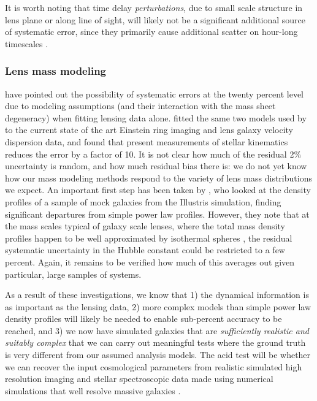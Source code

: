 It is worth noting that time delay {\it perturbations},  due to small
scale structure in lens plane or along line of sight, will likely not be
a significant  additional source of systematic error, since they
primarily cause additional scatter on hour-long timescales
\citep{K+M09}.


\subsubsection{Lens mass modeling}

\citet{S+S13} have pointed out the possibility of systematic errors at
the twenty percent level due to modeling assumptions (and their
interaction with the mass sheet degeneracy) when fitting lensing data
alone.
\citet{Suy++14} fitted the same two models used by
\citet{S+S13}  to the current state of the art Einstein ring imaging and
lens galaxy velocity dispersion data, and found that present
measurements of stellar kinematics reduces the error by a factor of
10.  It is not clear how much of the residual 2\% uncertainty is
random, and how much residual bias there is: we do not
yet know how our mass modeling methods respond to the variety of lens
mass distributions we expect. An important first step has been taken
by \citet{XuEtal2016}, who looked at the density profiles of a sample
of mock galaxies from the Illustris simulation, finding significant
departures from simple power law profiles. However, they note that at
the mass scales typical of galaxy scale lenses, where the total mass
density profiles happen to be well approximated by isothermal spheres
\citep{Koo++09,Aug++10}, the residual systematic uncertainty
in the Hubble constant could be restricted to a few percent.
Again, it remains to be verified how much of this averages out
given particular, large samples of systems.

As a result of these investigations, we know that 1) the dynamical
information is as important as the lensing data, 2) more complex
models than simple power law density profiles will likely be needed to
enable sub-percent accuracy to be reached, and 3) we now have
simulated galaxies that are {\it sufficiently realistic and suitably
complex} that we can carry out meaningful tests where the ground truth
is very different from our assumed analysis models. The acid test will
be whether we can recover the input cosmological parameters from
realistic simulated high resolution imaging and stellar spectroscopic
data made using numerical simulations that well resolve massive
galaxies \citep[e.g.,][]{Fia++16}.

